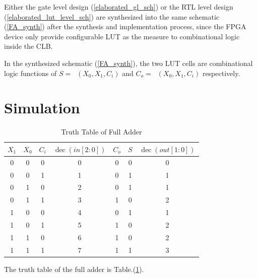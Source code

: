 \documentclass[conference]{IEEEtran}
\begin{document}
Either the gate level design (\ref{elaborated_gl_sch}) or the RTL level design (\ref{elaborated_lut_level_sch}) are synthesized into the same schematic (\ref{FA_synth}) after the synthesis and implementation process, since the FPGA device only provide configurable LUT as the measure to combinational logic inside the CLB.

In the synthesized schematic (\ref{FA_synth}), the two LUT cells are combinational logic functions of \(S=\mathop{\mathrm{LUT_1}}(X_0,X_1,C_i)\) and \(C_o=\mathop{\mathrm{LUT_2}}(X_0,X_1,C_i)\) respectively.

\section{Simulation}

\begin{table}
	\begin{center}
		\begin{tabular}[htb]{ccccccc}
			\toprule
			\(X_1\) & \(X_0\) & \(C_i\) & \(\mathop{\mathrm{dec}}(in[2:0])\) & \(C_o\) & \(S\) & \(\mathop{\mathrm{dec}}(out[1:0])\) \\
			\midrule
			0       & 0       & 0       & 0                                  & 0       & 0     & 0                                   \\
			0       & 0       & 1       & 1                                  & 0       & 1     & 1                                   \\
			0       & 1       & 0       & 2                                  & 0       & 1     & 1                                   \\
			0       & 1       & 1       & 3                                  & 1       & 0     & 2                                   \\
			1       & 0       & 0       & 4                                  & 0       & 1     & 1                                   \\
			1       & 0       & 1       & 5                                  & 1       & 0     & 2                                   \\
			1       & 1       & 0       & 6                                  & 1       & 0     & 2                                   \\
			1       & 1       & 1       & 7                                  & 1       & 1     & 3                                   \\
			\bottomrule
		\end{tabular}
		\caption{Truth Table of Full Adder}
		\label{tt_fa}
	\end{center}
\end{table}

The truth table of the full adder is Table.(\ref{tt_fa}).
\end{document}
